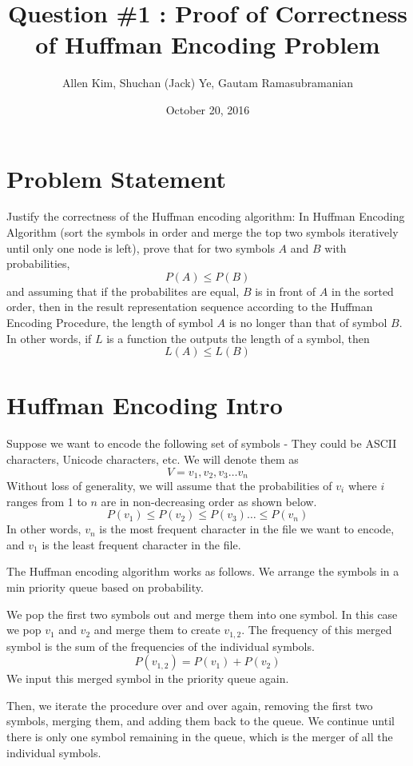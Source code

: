 \documentclass{article}
\title{Question \#1 : Proof of Correctness of Huffman Encoding Problem}
\author{Allen Kim, Shuchan (Jack) Ye, Gautam Ramasubramanian}
\date{October 20, 2016}
\begin{document}
\maketitle

\section*{Problem Statement}

Justify the correctness of the Huffman encoding algorithm: 
In Huffman Encoding Algorithm (sort the symbols in order and merge the top two symbols iteratively until only one node is left), 
prove that for two symbols $A$ and $B$ with probabilities,
$$
	P(A) \leq P(B)
$$
and assuming that if the probabilites are equal, $B$ is in front of $A$ in the sorted order, then in the result representation sequence according to the Huffman Encoding Procedure,
the length of symbol $A$ is no longer than that of symbol $B$. In other words, if $L$ is a function the outputs the length of a symbol, then
$$
	L(A) \leq L(B)
$$

\section*{Huffman Encoding Intro}

Suppose we want to encode the following set of symbols - They could be ASCII characters, Unicode characters, etc. We will denote them as
$$
V = {v_1, v_2, v_3 \ldots v_n}
$$
Without loss of generality, we will assume that the probabilities of $v_i$ where $i$ ranges from 1 to $n$ are in non-decreasing order as shown below.
$$
P(v_1) \leq P(v_2) \leq P(v_3) \ldots \leq P(v_n)
$$ 
In other words, $v_n$ is the most frequent character in the file we want to encode, and $v_1$ is the least frequent character in the file.

The Huffman encoding algorithm works as follows. We arrange the symbols in a min priority queue based on probability.

We pop the first two symbols out and merge them into one symbol. In this case we pop $v_1$ and $v_2$ and merge them to create $v_{1,2}$. The frequency of this merged symbol is the sum of the frequencies of the individual symbols.
$$
P(v_{1,2}) = P(v_1) + P(v_2)
$$
We input this merged symbol in the priority queue again.

Then, we iterate the procedure over and over again, removing the first two symbols, merging them, and adding them back to the queue. We continue until there is only one symbol remaining in the queue, which is the merger of all the individual symbols.
\end{document}
